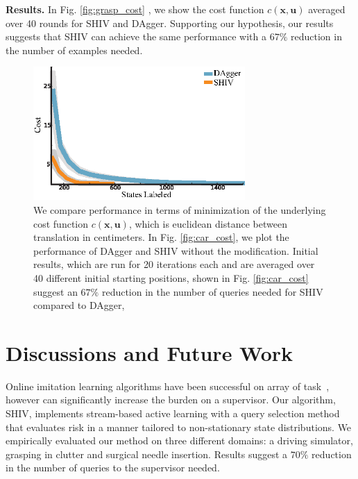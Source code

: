 \documentclass[10pt, conference]{ieeeconf}      %
\newcommand{\bu}{\mathbf{u}}
\newcommand{\bx}{\mathbf{x}}
\begin{document}
\noindent\textbf{Results. }
 In Fig. \ref{fig:grasp_cost} , we show the cost function $c(\bx,\bu)$ averaged over 40 rounds for SHIV and DAgger. Supporting our hypothesis, our results suggests that SHIV can achieve the same performance with a $67\%$ reduction in the number of examples needed.






\begin{figure}[t!]
\centering
\includegraphics[width=\columnwidth, height=2in]{figures/needle_insertion_results.eps}
\caption{We compare performance in terms of minimization of the underlying cost function $c(\bx,\bu)$, which is euclidean distance between translation in centimeters. In Fig. \ref{fig:car_cost}, we plot the performance of DAgger and SHIV without the modification.  Initial results, which are run for 20 iterations each and are averaged over 40 different initial starting positions, shown in Fig. \ref{fig:car_cost} suggest an $67\%$ reduction in the number of queries needed for SHIV compared to DAgger,}
\vspace*{-10pt}
\label{fig:needle}
\end{figure}



\section{Discussions and Future Work}
Online imitation learning algorithms have been successful on array of task~\cite{NIPS2014_5421,ross2010reduction}, however can significantly increase the burden on a supervisor. Our algorithm, SHIV, implements stream-based active learning with a query selection method that evaluates risk in a manner tailored to non-stationary state distributions. We empirically evaluated our method on three different domains: a driving simulator, grasping in clutter and surgical needle insertion. Results suggest a $70\%$ reduction in the number of queries to the supervisor needed. 
\end{document}
